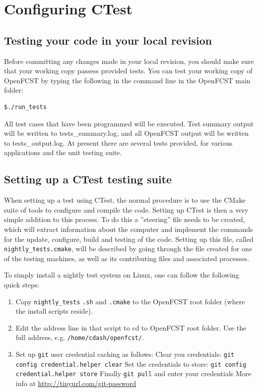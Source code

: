 \section{Configuring CTest}

\subsection{Testing your code in your local revision}
Before committing any changes made in your local revision, you should make sure that your working copy  passess provided tests. You can test your working copy of OpenFCST by typing the following in the command line in the OpenFCST main folder:
\begin{lstlisting}
$./run_tests
\end{lstlisting}

All test cases that have been programmed will be executed. Test summary output will be written to tests\_summary.log, and all OpenFCST output will be written to tests\_output.log. At present there are several tests provided, for various applications and the unit testing suite. 

\subsection{Setting up a CTest testing suite}\label{sec:setting_up_CTest}

When setting up a test using CTest, the normal procedure is to use the CMake suite of tools to configure and compile the code. Setting up CTest is then a very simple addition to this process.  To do this a ''steering'' file needs to be created, which will extract information about the computer and implement the commands for the update, configure, build and testing of the code. Setting up this file, called \verb!nightly_tests.cmake!, will be described by going through the file created for one of the testing machines, as well as its contributing files and associated processes.

To simply install a nightly test system on Linux, one can follow the following quick steps:
\begin{enumerate}
 \item Copy \verb!nightly_tests! \verb!.sh! and \verb!.cmake! to the OpenFCST root folder (where the install scripts reside).
 \item Edit the address line in that script to cd to OpenFCST root folder. Use the full address, e.g. \verb!/home/cdash/openfcst/!.
 \item Set up \verb!git! user credential caching as follows:
  \subitem Clear you credentials: \verb!git config credential.helper clear!
  \subitem Set the credentials to store: \verb!git config credential.helper store!
  \subitem Finally \verb!git pull! and enter your credentials
  \subitem More info at  \url{http://tinyurl.com/git-password}
\end{enumerate}

